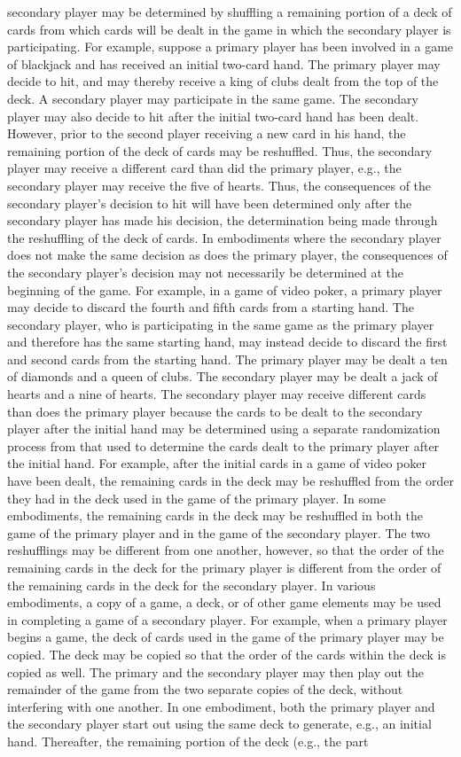 \documentclass[11pt,a4paper]{article}
\begin{document}
secondary player may be determined by shuffling a remaining portion of a deck of cards from which cards will be dealt in the game in which the secondary player is participating. For example, suppose a primary player has been involved in a game of blackjack and has received an initial two-card hand. The primary player may decide to hit, and may thereby receive a king of clubs dealt from the top of the deck. A secondary player may participate in the same game. The secondary player may also decide to hit after the initial two-card hand has been dealt. However, prior to the second player receiving a new card in his hand, the remaining portion of the deck of cards may be reshuffled. Thus, the secondary player may receive a different card than did the primary player, e.g., the secondary player may receive the five of hearts. Thus, the consequences of the secondary player's decision to hit will have been determined only after the secondary player has made his decision, the determination being made through the reshuffling of the deck of cards. In embodiments where the secondary player does not make the same decision as does the primary player, the consequences of the secondary player's decision may not necessarily be determined at the beginning of the game. For example, in a game of video poker, a primary player may decide to discard the fourth and fifth cards from a starting hand. The secondary player, who is participating in the same game as the primary player and therefore has the same starting hand, may instead decide to discard the first and second cards from the starting hand. The primary player may be dealt a ten of diamonds and a queen of clubs. The secondary player may be dealt a jack of hearts and a nine of hearts. The secondary player may receive different cards than does the primary player because the cards to be dealt to the secondary player after the initial hand may be determined using a separate randomization process from that used to determine the cards dealt to the primary player after the initial hand. For example, after the initial cards in a game of video poker have been dealt, the remaining cards in the deck may be reshuffled from the order they had in the deck used in the game of the primary player. In some embodiments, the remaining cards in the deck may be reshuffled in both the game of the primary player and in the game of the secondary player. The two reshufflings may be different from one another, however, so that the order of the remaining cards in the deck for the primary player is different from the order of the remaining cards in the deck for the secondary player. In various embodiments, a copy of a game, a deck, or of other game elements may be used in completing a game of a secondary player. For example, when a primary player begins a game, the deck of cards used in the game of the primary player may be copied. The deck may be copied so that the order of the cards within the deck is copied as well. The primary and the secondary player may then play out the remainder of the game from the two separate copies of the deck, without interfering with one another. In one embodiment, both the primary player and the secondary player start out using the same deck to generate, e.g., an initial hand. Thereafter, the remaining portion of the deck (e.g., the part 
\end{document}
